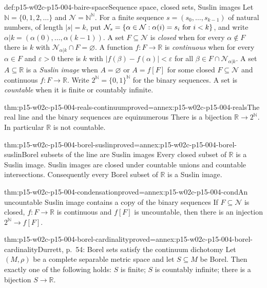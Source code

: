 \begin{hbdefinition}{def:p15-w02c-p15-004-baire-space}{Sequence space, closed sets, Suslin images}
Let \(\mathbb N=\{0,1,2,\ldots\}\) and \(\mathcal N=\mathbb N^{\mathbb N}\).
For a finite sequence \(s=(s_0,\ldots,s_{k-1})\) of natural numbers,
of length \(|s|=k\), put
\(\mathcal N_s=\{\alpha\in\mathcal N:\alpha(i)=s_i\hbox{ for }i<k\}\),
and write \(\alpha|k=(\alpha(0),\ldots,\alpha(k-1))\). A set
\(F\subseteq\mathcal N\) is \emph{closed} when for every
\(\alpha\notin F\) there is \(k\) with \(\mathcal N_{\alpha|k}\cap F=\varnothing\).
A function \(f:F\to\mathbb R\) is \emph{continuous} when for every
\(\alpha\in F\) and \(\varepsilon>0\) there is \(k\) with
\(|f(\beta)-f(\alpha)|<\varepsilon\) for all
\(\beta\in F\cap\mathcal N_{\alpha|k}\). A set \(A\subseteq\mathbb R\)
is a \emph{Suslin image} when \(A=\varnothing\) or \(A=f[F]\) for some
closed \(F\subseteq\mathcal N\) and continuous \(f:F\to\mathbb R\).
Write \(2^{\mathbb N}=\{0,1\}^{\mathbb N}\) for the binary sequences.
A set is \emph{countable} when it is finite or countably infinite.
\end{hbdefinition}

\begin{hblemma}{thm:p15-w02c-p15-004-reals-continuum}{proved=annex:p15-w02c-p15-004-reals}{The real line and the binary sequences are equinumerous}
There is a bijection \(\mathbb R\to2^{\mathbb N}\). In particular
\(\mathbb R\) is not countable.
\end{hblemma}

\begin{hblemma}{thm:p15-w02c-p15-004-borel-suslin}{proved=annex:p15-w02c-p15-004-borel-suslin}{Borel subsets of the line are Suslin images}
Every closed subset of \(\mathbb R\) is a Suslin image. Suslin images
are closed under countable unions and countable intersections.
Consequently every Borel subset of \(\mathbb R\) is a Suslin image.
\end{hblemma}

\begin{hblemma}{thm:p15-w02c-p15-004-condensation}{proved=annex:p15-w02c-p15-004-cond}{An uncountable Suslin image contains a copy of the binary sequences}
If \(F\subseteq\mathcal N\) is closed, \(f:F\to\mathbb R\) is
continuous and \(f[F]\) is uncountable, then there is an injection
\(2^{\mathbb N}\to f[F]\).
\end{hblemma}

\begin{hbtheorem}{thm:p15-w02c-p15-004-borel-cardinality}{proved=annex:p15-w02c-p15-004-borel-cardinality}{Durrett, p.~54: Borel sets satisfy the continuum dichotomy}
Let \((M,\rho)\) be a complete separable metric space and let
\(S\subseteq M\) be Borel. Then exactly one of the following holds:
\(S\) is finite; \(S\) is countably infinite; there is a bijection
\(S\to\mathbb R\).
\end{hbtheorem}

